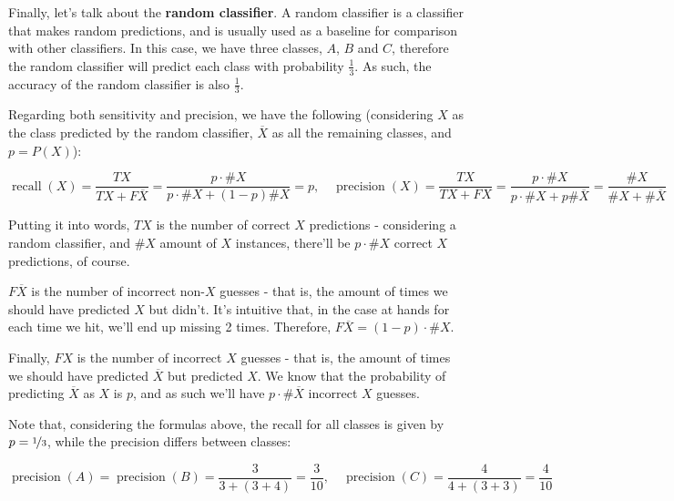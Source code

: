 \documentclass[12pt]{article}
\begin{document}
\begin{enumerate}[leftmargin=\labelsep]
        Finally, let's talk about the \textbf{random classifier}. A random classifier
        is a classifier that makes random predictions, and is usually used as a baseline
        for comparison with other classifiers. In this case, we have three classes, $A$, $B$ and $C$,
        therefore the random classifier will predict each class with probability $\frac{1}{3}$.
        As such, the accuracy of the random classifier is also $\frac{1}{3}$.

        Regarding both sensitivity and precision, we have the following (considering
        $X$ as the class predicted by the random classifier, $\overline{X}$ as all
        the remaining classes, and $p = P(X)$):

        \begin{equation*}
          \operatorname{recall}(X) = \frac{TX}{TX + F\overline{X}} = \frac{p \cdot \#X}{p \cdot \#X + (1 - p) \#X} = p, \quad
          \operatorname{precision}(X) = \frac{TX}{TX + FX} = \frac{p \cdot \#X}{p \cdot \#X + p \#\overline{X}} = \frac{\#X}{\#X + \#\overline{X}}
        \end{equation*}

        Putting it into words, $TX$ is the number of correct $X$ predictions - considering
        a random classifier, and $\#X$ amount of $X$ instances, there'll be $p \cdot \#X$ correct
        $X$ predictions, of course.

        $F\overline{X}$ is the number of incorrect non-$X$ guesses - that is, the
        amount of times we should have predicted $X$ but didn't.
        It's intuitive that, in the case at hands for each time we hit, we'll end up missing
        2 times. Therefore, $F\overline{X} = (1 - p) \cdot \#X$.

        Finally, $FX$ is the number of incorrect $X$ guesses - that is, the amount of
        times we should have predicted $\overline{X}$ but predicted $X$.
        We know that the probability of predicting $\overline{X}$ as $X$ is $p$,
        and as such we'll have $p \cdot \#\overline{X}$ incorrect $X$ guesses.

        Note that, considering the formulas above, the recall for all classes is given
        by $p = \nicefrac{1}{3}$, while the precision differs between classes:

        \begin{equation*}
          \operatorname{precision}(A) = \operatorname{precision}(B) = \frac{3}{3 + (3 + 4)} = \frac{3}{10}, \quad
          \operatorname{precision}(C) = \frac{4}{4 + (3 + 3)} = \frac{4}{10}
        \end{equation*}


\end{enumerate}
\end{document}
